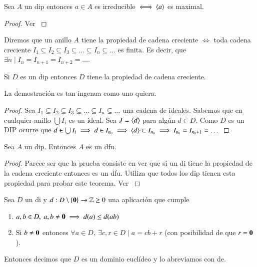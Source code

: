 \begin{thm}
	Sea $A$ un \gls{dip} entonces $a \in A$ es irreducible $\iff \langle a\rangle$ es maximal.
\end{thm}

\begin{proof}
	Ver \cite[p.~247]{dor96}
\end{proof}


\begin{dfn}
	
	Diremos que un anillo $A$ tiene la propiedad de cadena creciente $\iff$ toda cadena creciente $I_1 \subseteq I_2 \subseteq I_3 \subseteq \dots \subseteq I_n \subseteq \dots$ es finita. Es decir, que $\exists n \mid I_n = I_{n+1} = I_{n+2} = \dots$.
\end{dfn}

\begin{pro}
	Si $D$ es un \gls{dip} entonces $D$ tiene la propiedad de cadena creciente.
\end{pro}

La demostración es tan ingenua como uno quiera.

\begin{proof}
	Sea $I_1 \subseteq I_2 \subseteq I_3 \subseteq \dots \subseteq I_n \subseteq \dots$ una cadena de ideales. Sabemos que en cualquier anillo $\bigcup I_i$ es un ideal. Sea $J = \langle d\rangle$ para algún $d \in D$. Como $D$ es un DIP ocurre que $d \in \bigcup I_i \implies d \in I_{n_0} \implies \langle d\rangle \subset I_{n_0} \implies I_{n_0} = I_{n_0 + 1} = \dots$
\end{proof}

\begin{thm}
	Sea $A$ un \gls{dip}. Entonces $A$ es un \gls{dfu}.
\end{thm}

\begin{proof}
	Parece ser que la prueba consiste en ver que si un \gls{di} tiene la propiedad de la cadena creciente entonces es un \gls{dfu}. Utiliza que todos los \gls{dip} tienen esta propiedad para probar este teorema. Ver \cite[p.~248]{dor96}
\end{proof}

\begin{dfn}
	\label{dfn:de}
	Sea $D$ un \gls{di} y $d: D \setminus \{\mathbf{0}\} \to \mathbb{Z} \geq 0$ una aplicación que cumple
	\begin{enumerate}
		\item $a,b \in D,\ a,b \neq \mathbf{0} \implies d(a) \leq d(ab)$
		\item Si $b \neq \mathbf{0}$ entonces $\forall a \in D,\ \exists c,r \in D \mid a = cb+r$ (con posibilidad de que $r = \mathbf{0}$).
	\end{enumerate}
	Entonces decimos que $D$ es un dominio euclídeo y lo abreviamos con \gls{de}.
\end{dfn}

